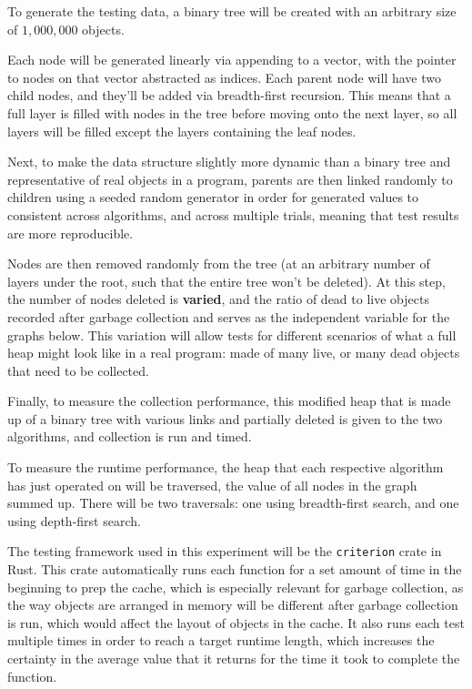 \documentclass[index]{subfiles}
\begin{document}
To generate the testing data, a binary tree will be created with an arbitrary size of \(1,000,000\) objects. 


Each node will be generated linearly via appending to a vector, with the pointer to nodes on that vector abstracted as indices. Each parent node will have two child nodes, and they'll be added via breadth-first recursion. This means that a full layer is filled with nodes in the tree before moving onto the next layer, so all layers will be filled except the layers containing the leaf nodes.

Next, to make the data structure slightly more dynamic than a binary tree and representative of real objects in a program, parents are then linked randomly to children using a seeded random generator in order for generated values to consistent across algorithms, and across multiple trials, meaning that test results are more reproducible. 

Nodes are then removed randomly from the tree (at an arbitrary number of layers under the root, such that the entire tree won't be deleted). At this step, the number of nodes deleted is \textbf{varied}, and the ratio of dead to live objects recorded after garbage collection and serves as the independent variable for the graphs below. This variation will allow tests for different scenarios of what a full heap might look like in a real program: made of many live, or many dead objects that need to be collected.

Finally, to measure the collection performance, this modified heap that is made up of a binary tree with various links and partially deleted is given to the two algorithms, and collection is run and timed. 

To measure the runtime performance, the heap that each respective algorithm has just operated on will be traversed, the value of all nodes in the graph summed up. There will be two traversals: one using breadth-first search, and one using depth-first search.

The testing framework used in this experiment will be the \verb+criterion+ crate in Rust. This crate automatically runs each function for a set amount of time in the beginning to prep the cache\cite{brookheislerAnalysisProcessCriterion}, which is especially relevant for garbage collection, as the way objects are arranged in memory will be different after garbage collection is run, which would affect the layout of objects in the cache. It also runs each test multiple times in order to reach a target runtime length, which increases the certainty in the average value that it returns for the time it took to complete the function.
\end{document}
